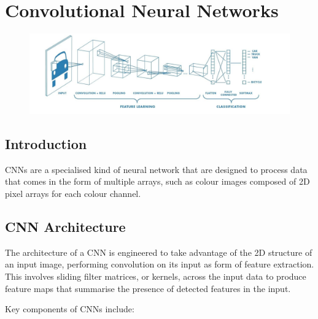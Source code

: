\chapter{Convolutional Neural Networks}
\begin{figure}[H]
    \centering
    \includegraphics[width=0.75\linewidth]{img/CNN_diagram.png}
\end{figure}


\section{Introduction}

 CNNs are a specialised kind of neural network that are designed to process data that comes in the form of multiple arrays, such as colour images composed of 2D pixel arrays for each colour channel.

\section{CNN Architecture}

The architecture of a CNN is engineered to take advantage of the 2D structure of an input image, performing convolution on its input as form of feature extraction. This involves sliding filter matrices, or kernels, across the input data to produce feature maps that summarise the presence of detected features in the input.

Key components of CNNs include:

